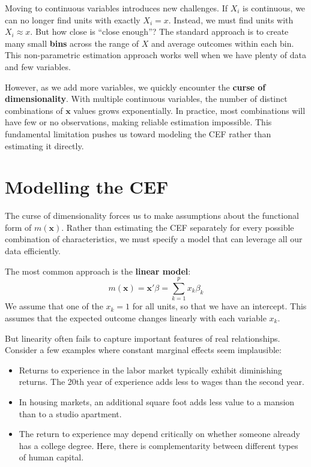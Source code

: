 \documentclass[12pt]{article}
\begin{document}
\begin{multicols}{2}
Moving to continuous variables introduces new challenges.
If $X_i$ is continuous, we can no longer find units with exactly $X_i = x$.
Instead, we must find units with $X_i \approx x$.
But how close is ``close enough''?
The standard approach is to create many small \textbf{bins} across the range of $X$ and average outcomes within each bin.
This non-parametric estimation approach works well when we have plenty of data and few variables.

However, as we add more variables, we quickly encounter the \textbf{curse of dimensionality}.
With multiple continuous variables, the number of distinct combinations of $\bm{x}$ values grows exponentially.
In practice, most combinations will have few or no observations, making reliable estimation impossible.
This fundamental limitation pushes us toward modeling the CEF rather than estimating it directly.

\section*{Modelling the CEF}

The curse of dimensionality forces us to make assumptions about the functional form of $m(\bm{x})$.
Rather than estimating the CEF separately for every possible combination of characteristics, we must specify a model that can leverage all our data efficiently.

The most common approach is the \textbf{linear model}:
$$
  m(\bm{x}) = \bm{x}' \beta = \sum_{k=1}^p x_{k} \beta_k
$$
We assume that one of the $x_k = 1$ for all units, so that we have an intercept.
This assumes that the expected outcome changes linearly with each variable $x_k$.

But linearity often fails to capture important features of real relationships.
Consider a few examples where constant marginal effects seem implausible:
\begin{itemize}
  \item Returns to experience in the labor market typically exhibit diminishing returns. 
  The 20th year of experience adds less to wages than the second year.

  \item In housing markets, an additional square foot adds less value to a mansion than to a studio apartment.
  
  \item The return to experience may depend critically on whether someone already has a college degree. 
  Here, there is complementarity between different types of human capital.
\end{itemize}


\end{multicols}
\end{document}
